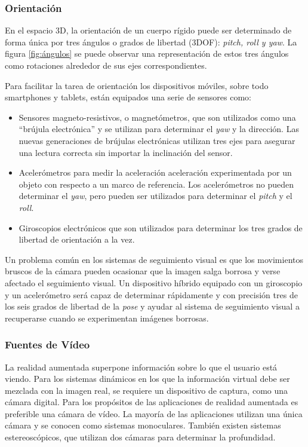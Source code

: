 \subsubsection{Orientación}
En el espacio 3D, la orientación de un cuerpo rígido puede ser determinado de forma única por tres ángulos o grados de libertad (3DOF): \emph{pitch, roll y yaw}. La figura \ref{fig:ángulos}  se puede observar una representación de estos tres ángulos como rotaciones alrededor de sus ejes correspondientes. 

Para facilitar la tarea de orientación los dispositivos móviles, sobre todo smartphones y tablets, están equipados una serie de sensores como:
\begin{itemize}
\item Sensores magneto-resistivos, o magnetómetros, que son utilizados como una ``brújula electrónica'' y se utilizan para determinar el \emph{yaw} y la dirección. Las nuevas generaciones de brújulas electrónicas utilizan tres ejes para asegurar una lectura correcta sin importar la inclinación del sensor.
 
\item Acelerómetros para medir la aceleración aceleración experimentada por un objeto con respecto a un marco de referencia. Los acelerómetros no pueden determinar el \emph{yaw}, pero pueden ser utilizados para determinar el \emph{pitch} y el \emph{roll}. 
\item Giroscopios electrónicos que son utilizados para determinar los tres grados de libertad de orientación a la vez.
\end{itemize}

Un problema común en los sistemas de seguimiento visual es que los movimientos bruscos de la cámara pueden ocasionar que la imagen salga borrosa y verse afectado el seguimiento visual. Un dispositivo híbrido equipado con un giroscopio y un acelerómetro será capaz de determinar rápidamente y con precisión tres de los seis grados de libertad de la \emph{pose} y ayudar al sistema de seguimiento visual a recuperarse cuando se experimentan imágenes borrosas. 

\subsubsection{Fuentes de Vídeo}
La realidad aumentada superpone información sobre lo que el usuario está viendo. Para los sistemas dinámicos en los que la información virtual debe ser mezclada con la imagen real, se requiere un dispositivo de captura, como una cámara digital. Para los propósitos de las aplicaciones de realidad aumentada es preferible una cámara de vídeo. La mayoría de las aplicaciones utilizan una única cámara y se conocen como sistemas monoculares. También existen sistemas estereoscópicos, que  utilizan dos cámaras para determinar la profundidad.

